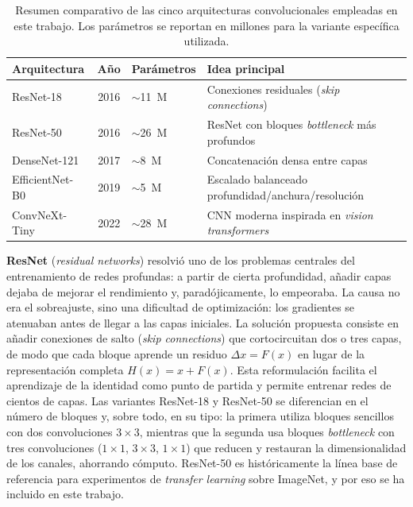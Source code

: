 \documentclass[12pt]{extarticle}
\numberwithin{equation}{section}
\begin{document}
\begin{refsection}
\begin{table}[H]
\centering
\caption{Resumen comparativo de las cinco arquitecturas convolucionales empleadas en este trabajo. Los parámetros se reportan en millones para la variante específica utilizada.}
\label{tab:arquitecturas}
\small
\begin{tabular}{lcll}
\toprule
\textbf{Arquitectura} & \textbf{Año} & \textbf{Parámetros} & \textbf{Idea principal} \\
\midrule
ResNet-18       & 2016 & $\sim$11~M & Conexiones residuales (\textit{skip connections}) \\
ResNet-50       & 2016 & $\sim$26~M & ResNet con bloques \textit{bottleneck} más profundos \\
DenseNet-121    & 2017 & $\sim$8~M  & Concatenación densa entre capas \\
EfficientNet-B0 & 2019 & $\sim$5~M  & Escalado balanceado profundidad/anchura/resolución \\
ConvNeXt-Tiny   & 2022 & $\sim$28~M & CNN moderna inspirada en \textit{vision transformers} \\
\bottomrule
\end{tabular}
\end{table}

\textbf{ResNet} \cite{he2016deep} (\textit{residual networks}) resolvió uno de los problemas centrales del entrenamiento de redes profundas: a partir de cierta profundidad, añadir capas dejaba de mejorar el rendimiento y, paradójicamente, lo empeoraba. La causa no era el sobreajuste, sino una dificultad de optimización: los gradientes se atenuaban antes de llegar a las capas iniciales. La solución propuesta consiste en añadir conexiones de salto (\textit{skip connections}) que cortocircuitan dos o tres capas, de modo que cada bloque aprende un residuo $\Delta x = F(x)$ en lugar de la representación completa $H(x) = x + F(x)$. Esta reformulación facilita el aprendizaje de la identidad como punto de partida y permite entrenar redes de cientos de capas. Las variantes ResNet-18 y ResNet-50 se diferencian en el número de bloques y, sobre todo, en su tipo: la primera utiliza bloques sencillos con dos convoluciones $3\times 3$, mientras que la segunda usa bloques \textit{bottleneck} con tres convoluciones ($1\times 1$, $3\times 3$, $1\times 1$) que reducen y restauran la dimensionalidad de los canales, ahorrando cómputo. ResNet-50 es históricamente la línea base de referencia para experimentos de \textit{transfer learning} sobre ImageNet, y por eso se ha incluido en este trabajo.


\end{refsection}
\end{document}
